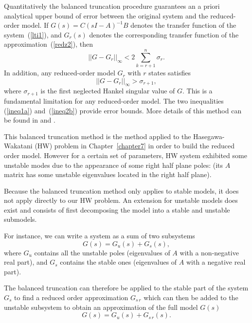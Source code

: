 \documentclass[12pt,lot, lof]{puthesis}
\begin{document}
Quantitatively the balanced truncation procedure guarantees an a priori analytical upper bound of error between the original system and the reduced-order model.  If $G(s)=C(sI-A)^{-1}B$ denotes the transfer function of the system~(\ref{lti1}), and $G_r(s)$ denotes the corresponding transfer function of the approximation~(\ref{redz2}), then 
\begin{equation}
\label{ineq1a}
|| G - G_r||_{\infty} < 2 \sum_{k= r+1} ^n \sigma_r.
\end{equation}
In addition, any reduced-order model $G_r$ with $r$ states satisfies 
 \begin{equation}
 \label{ineq2b}
|| G - G_r||_{\infty} > \sigma_{r+1},
\end{equation}
where $ \sigma_{r+1}$ is the first neglected Hankel singular value of $G$. This is a fundamental limitation for any reduced-order model. The two inequalities (\ref{ineq1a}) and~(\ref{ineq2b}) provide error bounds.
More details of this method can be found in \cite{Glover84} and \cite{SandP}.

This balanced truncation method is the method applied to the Hasegawa-Wakatani (HW) problem in Chapter~\ref{chapter7} in order to build the reduced order model. However for a certain set of parameters, HW system exhibited some unstable modes due to the appearance of some right half plane poles: (its $A$ matrix has some unstable eigenvalues located in the right half plane).

Because the balanced truncation method only applies to stable models, it does not apply directly to our HW problem. An extension for unstable models does exist and consists of first decomposing the model into a stable and unstable submodels.

For instance, we can write a system as a sum of two subsystems
\begin{equation}
G(s) = G_u(s)+ G_s(s),
\end{equation}
where $G_u$ contains all the unstable poles (eigenvalues of $A$ with a non-negative real part), and $G_s$ contains the stable ones (eigenvalues of $A$ with a negative real part).

The balanced truncation can therefore be applied to the stable part of the system $G_s$ to find a reduced order approximation $G_{s \, r}$
which can then be added to the unstable subsystem to obtain an approximation of the full model $G(s)$
\begin{equation}
G(s) = G_u(s)+ G_{s \, r}(s).
\end{equation}
\end{document}
